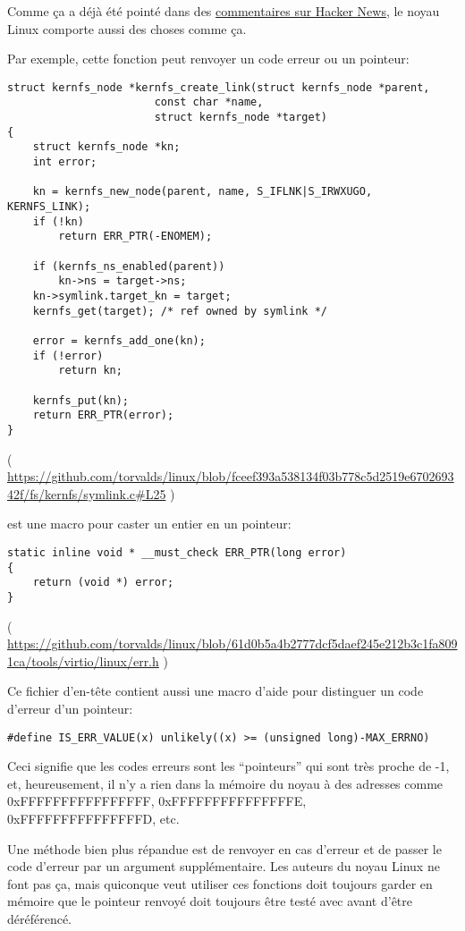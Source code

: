 Comme ça a déjà été pointé dans des \href{https://news.ycombinator.com/item?id=11823647}{commentaires sur Hacker News},
le noyau Linux comporte aussi des choses comme ça.

Par exemple, cette fonction peut renvoyer un code erreur ou un pointeur:

\begin{lstlisting}[style=customc]
struct kernfs_node *kernfs_create_link(struct kernfs_node *parent,
				       const char *name,
				       struct kernfs_node *target)
{
	struct kernfs_node *kn;
	int error;

	kn = kernfs_new_node(parent, name, S_IFLNK|S_IRWXUGO, KERNFS_LINK);
	if (!kn)
		return ERR_PTR(-ENOMEM);

	if (kernfs_ns_enabled(parent))
		kn->ns = target->ns;
	kn->symlink.target_kn = target;
	kernfs_get(target);	/* ref owned by symlink */

	error = kernfs_add_one(kn);
	if (!error)
		return kn;

	kernfs_put(kn);
	return ERR_PTR(error);
}
\end{lstlisting}

( \url{https://github.com/torvalds/linux/blob/fceef393a538134f03b778c5d2519e670269342f/fs/kernfs/symlink.c#L25} )

 est une macro pour caster un entier en un pointeur:

\begin{lstlisting}[style=customc]
static inline void * __must_check ERR_PTR(long error)
{
	return (void *) error;
}
\end{lstlisting}

( \url{https://github.com/torvalds/linux/blob/61d0b5a4b2777dcf5daef245e212b3c1fa8091ca/tools/virtio/linux/err.h} )

Ce fichier d'en-tête contient aussi une macro d'aide pour distinguer un code d'erreur
d'un pointeur:

\begin{lstlisting}[style=customc]
#define IS_ERR_VALUE(x) unlikely((x) >= (unsigned long)-MAX_ERRNO)
\end{lstlisting}

Ceci signifie que les codes erreurs sont les ``pointeurs'' qui sont très proche de
-1, et, heureusement, il n'y a rien dans la mémoire du noyau à des adresses comme
0xFFFFFFFFFFFFFFFF, 0xFFFFFFFFFFFFFFFE, 0xFFFFFFFFFFFFFFFD, etc.

Une méthode bien plus répandue est de renvoyer  en cas d'erreur et de passer
le code d'erreur par un argument supplémentaire.
Les auteurs du noyau Linux ne font pas ça, mais quiconque veut utiliser ces fonctions
doit toujours garder en mémoire que le pointeur renvoyé doit toujours être testé avec
 avant d'être déréférencé.

